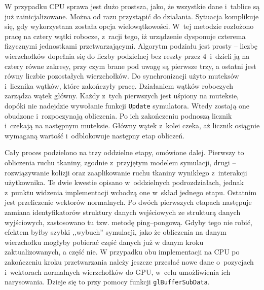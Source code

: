 		W przypadku CPU sprawa jest dużo prostsza, jako, że wszystkie dane i~tablice są już zainicjalizowane. Można od razu przystąpić do działania. Sytuacja komplikuje się, gdy wykorzystana została opcja wielowątkowości. W~tej metodzie rozłożono pracę na cztery wątki robocze, z~racji tego, iż urządzenie dysponuje czterema fizycznymi jednostkami przetwarzającymi. Algorytm podziału jest prosty -- liczbę wierzchołków dopełnia się do liczby podzielnej bez reszty przez 4~i~dzieli ją na cztery równe zakresy, przy czym brane pod uwagę są pierwsze trzy, a ostatni jest równy liczbie pozostałych wierzchołków. Do synchronizacji użyto muteksów i~licznika wątków, które zakończyły pracę. Działaniem wątków roboczych zarządza wątek główny. Każdy z~tych pierwszych jest uśpiony na muteksie, dopóki nie nadejdzie wywołanie funkcji \texttt{Update} symulatora. Wtedy zostają one obudzone i~rozpoczynają obliczenia. Po ich zakończeniu podnoszą licznik i~czekają na następnym muteksie. Główny wątek z~kolei czeka, aż licznik osiągnie wymaganą wartość i~odblokowuje następny etap obliczeń.
		
		Cały proces podzielono na trzy oddzielne etapy, omówione dalej. Pierwszy to obliczenia ruchu tkaniny, zgodnie z~przyjętym modelem symulacji, drugi -- rozwiązywanie kolizji oraz zaaplikowanie ruchu tkaniny wynikłego z~interakcji użytkownika. Te dwie kwestie opisano w~oddzielnych podrozdziałach, jednak z~punktu widzenia implementacji wchodzą one w~skład jednego etapu. Ostatnim jest przeliczenie wektorów normalnych. Po dwóch pierwszych etapach następuje zamiana identyfikatorów struktury danych wejściowych ze strukturą danych wyjściowych, zastosowano tu tzw. metodę ping--pongową. Gdyby tego nie robić, efektem byłby szybki ,,wybuch'' symulacji, jako że obliczenia na danym wierzchołku mogłyby pobierać część danych już w danym kroku zaktualizowanych, a część nie. W przypadku obu implementacji na CPU po zakończeniu kroku przetwarzania należy jeszcze przesłać nowe dane o~pozycjach i~wektorach normalnych wierzchołków do GPU, w~celu umożliwienia ich narysowania. Dzieje się to przy pomocy funkcji \texttt{glBufferSubData}.
		

